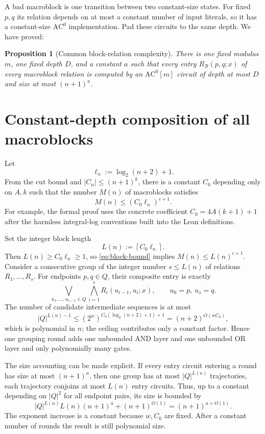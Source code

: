\documentclass[11pt]{article}
\newtheorem{proposition}[theorem]{Proposition}
\theoremstyle{definition}
\newcommand{\ACm}[1]{\mathrm{AC}^{0}[#1]}
\newcommand{\cB}{\mathcal{B}}
\newcommand{\ceil}[1]{\left\lceil #1\right\rceil}
\begin{document}
A bad macroblock is one transition between two constant-size states.  For
fixed $p,q$ its relation depends on at most a constant number of input literals,
so it has a constant-size $\mathrm{AC}^0$ implementation.  Pad these circuits
to the same depth.  We have proved:

\begin{proposition}[Common block-relation complexity]\label{prop:block-relations}
There is one fixed modulus $m$, one fixed depth $D$, and a constant $a$ such
that every entry $R_{\cB}(p,q;x)$ of every macroblock relation is computed by
an $\ACm{m}$ circuit of depth at most $D$ and size at most $(n+1)^a$.
\end{proposition}

\section{Constant-depth composition of all macroblocks}\label{sec:composition}

Let
\[
  \ell_n:=\log_2(n+2)+1.
\]
From the cut bound and $|C_n|\le(n+1)^k$, there is a constant $C_0$ depending
only on $A,k$ such that the number $M(n)$ of macroblocks satisfies
\begin{equation}\label{eq:block-bound}
  M(n)\le (C_0\ell_n)^{c+1}.
\end{equation}
For example, the formal proof uses the concrete coefficient
$C_0=4A(k+1)+1$ after the harmless integral-log conventions built into the
Lean definitions.

Set the integer block length
\[
  L(n):=\ceil{C_0\ell_n}.
\]
Then $L(n)\ge C_0\ell_n\ge1$, so \eqref{eq:block-bound} implies
$M(n)\le L(n)^{c+1}$.  Consider a consecutive group of the integer number
$s\le L(n)$ of relations $R_1,\ldots,R_s$.  For endpoints $p,q\in Q$, their
composite entry is exactly
\begin{equation}\label{eq:explicit-comp}
 \bigvee_{u_1,\ldots,u_{s-1}\in Q}
 \bigwedge_{i=1}^{s} R_i(u_{i-1},u_i;x),
 \qquad u_0=p,\ u_s=q.
\end{equation}
The number of candidate intermediate sequences is at most
\[
 |Q|^{L(n)-1}
 \le (2^w)^{C_0(\log_2(n+2)+1)+1}
 =(n+2)^{O(wC_0)},
\]
which is polynomial in $n$; the ceiling contributes only a constant factor.
Hence one grouping round adds one unbounded AND layer and one unbounded OR
layer and only polynomially many gates.

The size accounting can be made explicit.  If every entry circuit entering a
round has size at most $(n+1)^a$, then one group has at most
$|Q|^{L(n)}$ trajectories, each trajectory conjoins at most $L(n)$ entry
circuits.  Thus, up to a constant depending on $|Q|^2$ for all endpoint pairs,
its size is bounded by
\[
  |Q|^{L(n)}L(n)(n+1)^a+(n+1)^{O(1)}
  =(n+1)^{a+O(1)}.
\]
The exponent increase is a constant because $w,C_0$ are fixed.  After a
constant number of rounds the result is still polynomial size.
\end{document}
